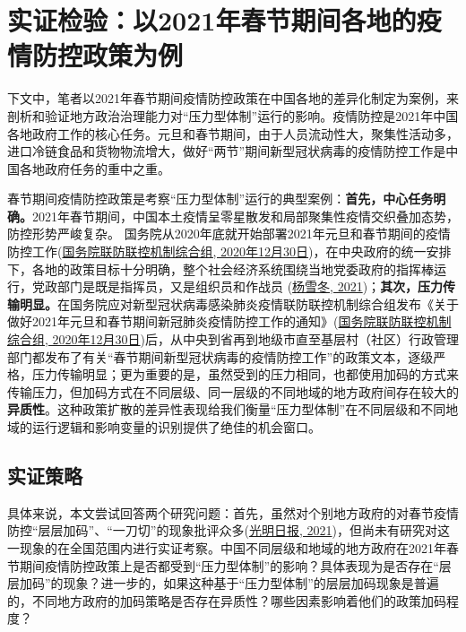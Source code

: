 \documentclass[
  12pt,
]{ctexart}
\begin{document}
\hypertarget{ux5b9eux8bc1ux68c0ux9a8cux4ee52021ux5e74ux6625ux8282ux671fux95f4ux5404ux5730ux7684ux75abux60c5ux9632ux63a7ux653fux7b56ux4e3aux4f8b}{%
\section{实证检验：以2021年春节期间各地的疫情防控政策为例}\label{ux5b9eux8bc1ux68c0ux9a8cux4ee52021ux5e74ux6625ux8282ux671fux95f4ux5404ux5730ux7684ux75abux60c5ux9632ux63a7ux653fux7b56ux4e3aux4f8b}}

下文中，笔者以2021年春节期间疫情防控政策在中国各地的差异化制定为案例，来剖析和验证地方政治治理能力对``压力型体制''运行的影响。疫情防控是2021年中国各地政府工作的核心任务。元旦和春节期间，由于人员流动性大，聚集性活动多，进口冷链食品和货物物流增大，做好``两节''期间新型冠状病毒的疫情防控工作是中国各地政府任务的重中之重。

春节期间疫情防控政策是考察``压力型体制''运行的典型案例：\textbf{首先，中心任务明确。}2021年春节期间，中国本土疫情呈零星散发和局部聚集性疫情交织叠加态势，防控形势严峻复杂。
国务院从2020年底就开始部署2021年元旦和春节期间的疫情防控工作(\protect\hyperlink{ref-GuoWuYuanLianFangLianKongJiZhiZongHeZu2020}{国务院联防联控机制综合组, 2020年12月30日})，在中央政府的统一安排下，各地的政策目标十分明确，整个社会经济系统围绕当地党委政府的指挥棒运行，党政部门是既是指挥员，又是组织员和作战员 (\protect\hyperlink{ref-YangXueDong2021}{杨雪冬, 2021})；\textbf{其次，压力传输明显。}在国务院应对新型冠状病毒感染肺炎疫情联防联控机制综合组发布《关于做好2021年元旦和春节期间新冠肺炎疫情防控工作的通知》(\protect\hyperlink{ref-GuoWuYuanLianFangLianKongJiZhiZongHeZu2020}{国务院联防联控机制综合组, 2020年12月30日})后，从中央到省再到地级市直至基层村（社区）行政管理部门都发布了有关``春节期间新型冠状病毒的疫情防控工作''的政策文本，逐级严格，压力传输明显；更为重要的是，虽然受到的压力相同，也都使用加码的方式来传输压力，但加码方式在不同层级、同一层级的不同地域的地方政府间存在较大的\textbf{异质性}。这种政策扩散的差异性表现给我们衡量``压力型体制''在不同层级和不同地域的运行逻辑和影响变量的识别提供了绝佳的机会窗口。

\hypertarget{ux5b9eux8bc1ux7b56ux7565}{%
\subsection{实证策略}\label{ux5b9eux8bc1ux7b56ux7565}}

具体来说，本文尝试回答两个研究问题：首先，虽然对个别地方政府的对春节疫情防控``层层加码''、``一刀切''的现象批评众多(\protect\hyperlink{ref-GuangMingRiBao2021}{光明日报, 2021})，但尚未有研究对这一现象的在全国范围内进行实证考察。中国不同层级和地域的地方政府在2021年春节期间疫情防控政策上是否都受到``压力型体制''的影响？具体表现为是否存在``层层加码''的现象？进一步的，如果这种基于``压力型体制''的层层加码现象是普遍的，不同地方政府的加码策略是否存在异质性？哪些因素影响着他们的政策加码程度？
\end{document}
